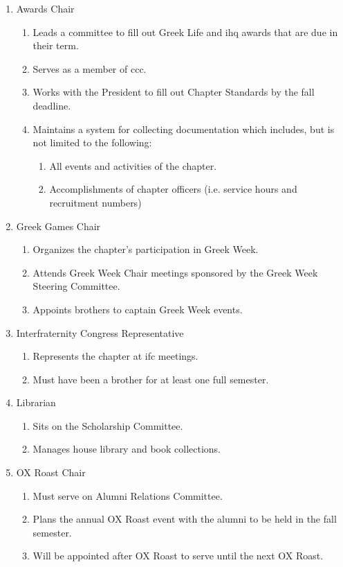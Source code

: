 \begin{enumerate}
		\item Awards Chair
			\begin{enumerate}
				\item Leads a committee to fill out Greek Life and \gls{ihq} awards that are due in their term.
				\item Serves as a member of \gls{ccc}.
				\item Works with the President to fill out Chapter Standards by the fall deadline.
				\item Maintains a system for collecting documentation which includes, but is not limited to the following:
					\begin{enumerate}
						\item All events and activities of the chapter.
						\item Accomplishments of chapter officers (i.e. service hours and recruitment numbers)
					\end{enumerate}
			\end{enumerate}

		\item Greek Games Chair
			\begin{enumerate}
				\item Organizes the chapter's participation in Greek Week.
				\item Attends Greek Week Chair meetings sponsored by the Greek Week Steering Committee.
				\item Appoints brothers to captain Greek Week events.
			\end{enumerate}

		\item Interfraternity Congress Representative
			\begin{enumerate}
				\item Represents the chapter at \gls{ifc} meetings.
				\item Must have been a brother for at least one full semester.
			\end{enumerate}

		\item Librarian
		\begin{enumerate}
			\item Sits on the Scholarship Committee.
			\item Manages house library and book collections.
		\end{enumerate}

		\item OX Roast Chair
			\begin{enumerate}
				\item Must serve on Alumni Relations Committee.
				\item Plans the annual OX Roast event with the alumni to be held in the fall semester.
				\item Will be appointed after OX Roast to serve until the next OX Roast.
			\end{enumerate}


\end{enumerate}
